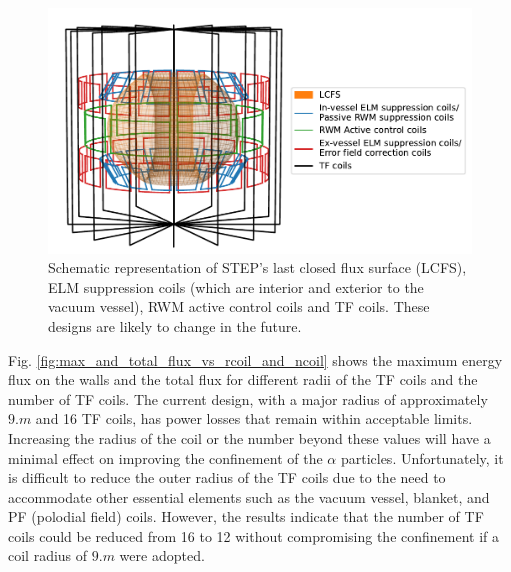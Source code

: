 \documentclass[10pt, a4paper, twoside]{article}
\begin{document}
\begin{figure}[!htb]
    \centering
    \includegraphics[width=0.8\linewidth]{Figures/coil_plot_3d.pdf}
    \caption{Schematic representation of STEP’s last closed flux surface (LCFS), ELM suppression coils (which are interior and exterior to the vacuum vessel), RWM active control coils and TF coils. These designs are likely to change in the future. 
}
    \label{fig:coil_plot_3d}
\end{figure}

Fig. \ref{fig:max_and_total_flux_vs_rcoil_and_ncoil} shows the maximum energy flux on the walls and the total flux for different radii of the TF coils and the number of TF coils. The current design, with a major radius of approximately $\si{9.m}$ and 16 TF coils, has power losses that remain within acceptable limits. Increasing the radius of the coil or the number beyond these values will have a minimal effect on improving the confinement of the $\alpha$ particles. 
Unfortunately, it is difficult to reduce the outer radius of the TF coils due to the need to accommodate other essential elements such as the vacuum vessel, blanket, and PF (polodial field) coils. However, the results indicate that the number of TF coils could be reduced from 16 to 12 without compromising the confinement if a coil radius of $9\si{.m}$ were adopted.
\end{document}
